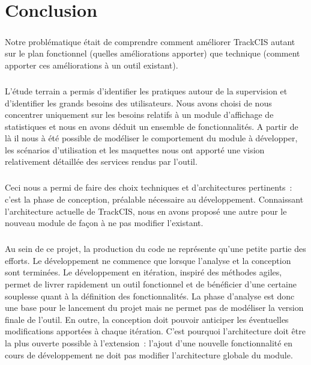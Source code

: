 \chapter*{Conclusion}
	\paragraph{}
	Notre problématique était de comprendre comment améliorer TrackCIS autant sur
	le plan fonctionnel (quelles améliorations apporter) que technique (comment
	apporter ces améliorations à un outil existant).
	
	\paragraph{}%
	L'étude terrain a permis d'identifier les pratiques autour de la supervision et
	d'identifier les grands besoins des utilisateurs. Nous avons choisi de nous
	concentrer uniquement sur les besoins relatifs à un module d'affichage de
	statistiques et nous en avons déduit un ensemble de fonctionnalités. A partir
	de là il nous à été possible de modéliser le comportement du module à
	développer, les scénarios d'utilisation et les maquettes nous ont apporté une
	vision relativement détaillée des services rendus par l'outil.
	
	\paragraph{}%
	Ceci nous a permi de faire des choix techniques et
	d'architectures pertinents~: c'est la phase de
	conception, préalable nécessaire au développement.
	Connaissant l'architecture actuelle de
	TrackCIS, nous en avons proposé une autre pour le nouveau module de façon à ne
	pas modifier l'existant.
	
	\paragraph{}%
	Au sein de ce projet, la production du code ne représente qu'une petite
	partie des efforts. Le développement ne commence que lorsque l'analyse et la
	conception sont terminées. Le développement en itération, inspiré des
	méthodes agiles, permet de livrer rapidement un outil fonctionnel et de
	bénéficier d'une certaine souplesse quant à la définition des fonctionnalités.
	La phase d'analyse est donc une base pour le lancement du projet mais ne
	permet pas de modéliser la version finale de l'outil. En outre, la
	conception doit pouvoir anticiper les éventuelles modifications apportées
	à chaque itération. C'est pourquoi l'architecture doit être la plus ouverte
	possible à l'extension~:
	l'ajout d'une nouvelle fonctionnalité en cours de développement ne doit pas
	modifier l'architecture globale du module.
	
